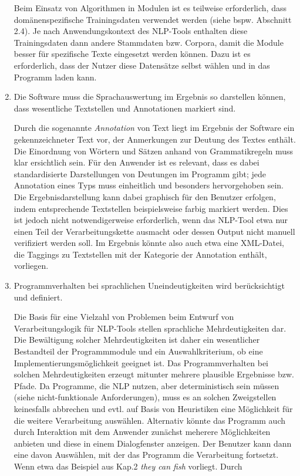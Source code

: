 \documentclass[12pt]{report}
\begin{document}
\begin{enumerate}
Beim Einsatz von Algorithmen in Modulen ist es teilweise erforderlich, dass domänenspezifische Trainingsdaten verwendet werden (siehe bspw. Abschnitt 2.4). Je nach Anwendungskontext des NLP-Tools enthalten diese Trainingsdaten dann andere Stammdaten bzw. Corpora, damit die Module besser für spezifische Texte eingesetzt werden können. Dazu ist es erforderlich, dass der Nutzer diese Datensätze selbst wählen und in das Programm laden kann.

\item Die Software muss die Sprachauswertung im Ergebnis so darstellen können, dass wesentliche Textstellen und Annotationen markiert sind. 

Durch die sogenannte \textit{Annotation} von Text liegt im Ergebnis der Software ein gekennzeichneter Text vor, der Anmerkungen zur Deutung des Textes enthält. Die Einordnung von Wörtern und Sätzen anhand von Grammatikregeln muss klar ersichtlich sein. Für den Anwender ist es relevant, dass es dabei standardisierte Darstellungen von Deutungen im Programm gibt; jede Annotation eines Typs muss einheitlich und besonders hervorgehoben sein. Die Ergebnisdarstellung kann dabei graphisch für den Benutzer erfolgen, indem entsprechende Textstellen beispielsweise farbig markiert werden. Dies ist jedoch nicht notwendigerweise erforderlich, wenn das NLP-Tool etwa nur einen Teil der Verarbeitungskette ausmacht oder dessen Output nicht manuell verifiziert werden soll. Im Ergebnis könnte also auch etwa eine XML-Datei, die Taggings zu Textstellen mit der Kategorie der Annotation enthält, vorliegen.

\item Programmverhalten bei sprachlichen Uneindeutigkeiten wird berücksichtigt und definiert.

Die Basis für eine Vielzahl von Problemen beim Entwurf von Verarbeitungslogik für NLP-Tools stellen sprachliche Mehrdeutigkeiten dar. Die Bewältigung solcher Mehrdeutigkeiten ist daher ein wesentlicher Bestandteil der Programmmodule und ein Auswahlkriterium, ob eine Implementierungsmöglichkeit geeignet ist. Das Programmverhalten bei solchen Mehrdeutigkeiten erzeugt mitunter mehrere plausible Ergebnisse bzw. Pfade. Da Programme, die NLP nutzen, aber deterministisch sein müssen (siehe nicht-funktionale Anforderungen), muss es an solchen Zweigstellen keinesfalls abbrechen und evtl. auf Basis von Heuristiken eine Möglichkeit für die weitere Verarbeitung auswählen. Alternativ könnte das Programm auch durch Interaktion mit dem Anwender zunächst meherere Möglichkeiten anbieten und diese in einem Dialogfenster anzeigen. Der Benutzer kann dann eine davon Auswählen, mit der das Programm die Verarbeitung fortsetzt. Wenn etwa das Beispiel aus Kap.2 \textit{they can fish} vorliegt.
Durch 


\end{enumerate}
\end{document}
